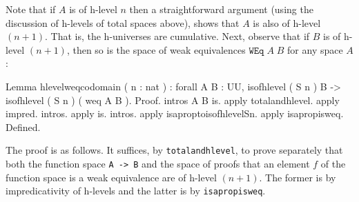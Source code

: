 Note that if $A$ is of h-level $n$ then a straightforward argument
(using the discussion of h-levels of total spaces above), shows that
$A$ is also of h-level $(n+1)$.  That is, the h-universes are
cumulative.  Next, observe that if $B$ is of h-level $(n+1)$, then so
is the space of weak equivalences $\texttt{WEq}\;A\;B$ for any space
$A$:
\begin{center}
  \begin{coqcode}
Lemma hlevelweqcodomain ( n : nat ) : forall A B : UU, 
isofhlevel ( S n ) B -> isofhlevel ( S n ) ( weq A B ).
Proof.
  intros A B is. apply totalandhlevel. apply impred. 
  intros. apply is. intros. apply isaproptoisofhlevelSn. 
  apply isapropisweq.
Defined.
  \end{coqcode}
\end{center}
The proof is as follows.  It suffices, by 
\verb|totalandhlevel|, to prove separately that both the function
space \verb|A -> B| and the space of proofs that an element $f$ of
the function space is a weak equivalence are of h-level $(n+1)$.  The
former is by impredicativity of h-levels and the latter is by 
\verb|isapropisweq|.


